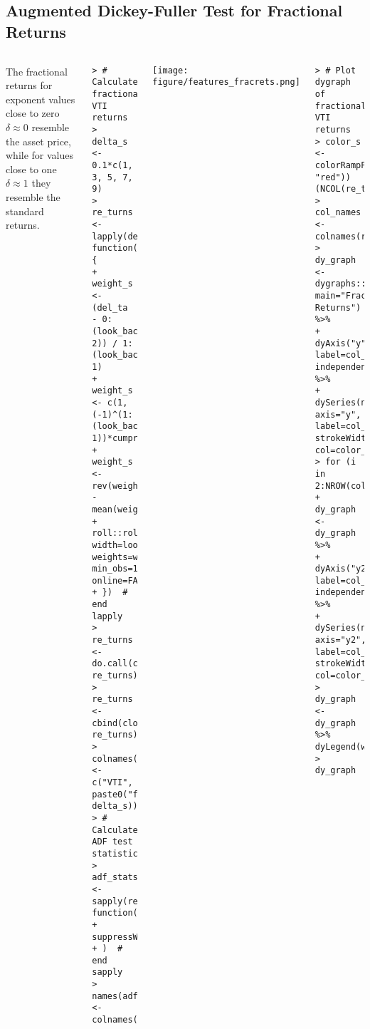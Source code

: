 \documentclass[10pt]{beamer}\usepackage[]{graphicx}\usepackage[]{color}
\makeatletter
\newenvironment{kframe}{%
 \def\at@end@of@kframe{}%
 \ifinner\ifhmode%
  \def\at@end@of@kframe{\end{minipage}}%
  \begin{minipage}{\columnwidth}%
 \fi\fi%
 \def\FrameCommand##1{\hskip\@totalleftmargin \hskip-\fboxsep
 \colorbox{shadecolor}{##1}\hskip-\fboxsep
     \hskip-\linewidth \hskip-\@totalleftmargin \hskip\columnwidth}%
 \MakeFramed {\advance\hsize-\width
   \@totalleftmargin\z@ \linewidth\hsize
   \@setminipage}}%
 {\par\unskip\endMakeFramed%
 \at@end@of@kframe}
\newenvironment{knitrout}{}{} %
\makeatother
\begin{document}
\subsection{Augmented Dickey-Fuller Test for Fractional Returns}
\begin{frame}[fragile,t]{\subsecname}
\vspace{-1em}
\begin{block}{}
  \begin{columns}[T]
      The fractional returns for exponent values close to zero $\delta \approx 0$ resemble the asset price, while for values close to one $\delta \approx 1$ they resemble the standard returns.
\begin{knitrout}\tiny
{}\color{fgcolor}\begin{kframe}
\begin{verbatim}
> # Calculate fractional VTI returns
> delta_s <- 0.1*c(1, 3, 5, 7, 9)
> re_turns <- lapply(delta_s, function(del_ta) {
+   weight_s <- (del_ta - 0:(look_back-2)) / 1:(look_back-1)
+   weight_s <- c(1, (-1)^(1:(look_back-1))*cumprod(weight_s))
+   weight_s <- rev(weight_s - mean(weight_s))
+   roll::roll_sum(clos_e, width=look_back, weights=weight_s, min_obs=1, online=FALSE)
+ })  # end lapply
> re_turns <- do.call(cbind, re_turns)
> re_turns <- cbind(clos_e, re_turns)
> colnames(re_turns) <- c("VTI", paste0("frac_", delta_s))
> # Calculate ADF test statistics
> adf_stats <- sapply(re_turns, function(x)
+   suppressWarnings(tseries::adf.test(x)$statistic)
+ )  # end sapply
> names(adf_stats) <- colnames(re_turns)
\end{verbatim}
\end{kframe}
\end{knitrout}
      \vspace{-1em}
      \texttt{[image: figure/features\_fracrets.png]}
\begin{knitrout}\tiny
{}\color{fgcolor}\begin{kframe}
\begin{verbatim}
> # Plot dygraph of fractional VTI returns
> color_s <- colorRampPalette(c("blue", "red"))(NCOL(re_turns))
> col_names <- colnames(re_turns)
> dy_graph <- dygraphs::dygraph(re_turns["2019"], main="Fractional Returns") %>%
+   dyAxis("y", label=col_names[1], independentTicks=TRUE) %>%
+   dySeries(name=col_names[1], axis="y", label=col_names[1], strokeWidth=2, col=color_s[1])
> for (i in 2:NROW(col_names))
+   dy_graph <- dy_graph %>%
+   dyAxis("y2", label=col_names[i], independentTicks=TRUE) %>%
+   dySeries(name=col_names[i], axis="y2", label=col_names[i], strokeWidth=2, col=color_s[i])
> dy_graph <- dy_graph %>% dyLegend(width=500)
> dy_graph
\end{verbatim}
\end{kframe}
\end{knitrout}
  \end{columns}
\end{block}

\end{frame}
\end{document}
